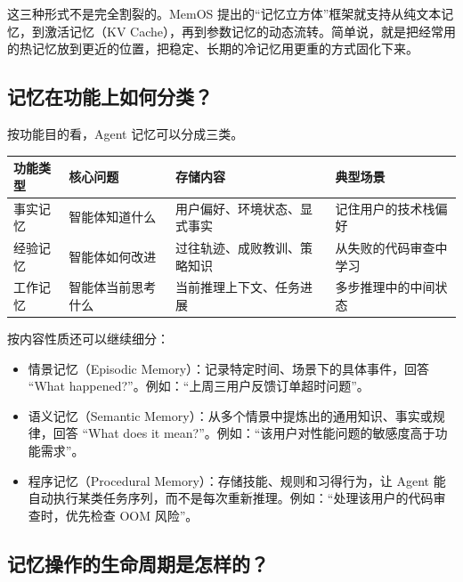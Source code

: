 \documentclass[9pt,a4paper,twocolumn]{ctexart}
\begin{document}
这三种形式不是完全割裂的。MemOS 提出的“记忆立方体”框架就支持从纯文本记忆，到激活记忆（KV Cache），再到参数记忆的动态流转。简单说，就是把经常用的热记忆放到更近的位置，把稳定、长期的冷记忆用更重的方式固化下来。



\subsection*{记忆在功能上如何分类？}


按功能目的看，Agent 记忆可以分成三类。


{\footnotesize
\begin{tabular}{|p{}|p{}|p{}|p{}|}
\hline
\textbf{功能类型} & \textbf{核心问题} & \textbf{存储内容} & \textbf{典型场景} \\
\hline
事实记忆 & 智能体知道什么 & 用户偏好、环境状态、显式事实 & 记住用户的技术栈偏好 \\
\hline
经验记忆 & 智能体如何改进 & 过往轨迹、成败教训、策略知识 & 从失败的代码审查中学习 \\
\hline
工作记忆 & 智能体当前思考什么 & 当前推理上下文、任务进展 & 多步推理中的中间状态 \\
\hline
\end{tabular}
}



按内容性质还可以继续细分：


\begin{itemize}[itemsep=1pt, topsep=2pt]
  \item 情景记忆（Episodic Memory）：记录特定时间、场景下的具体事件，回答 “What happened?”。例如：“上周三用户反馈订单超时问题”。
  \item 语义记忆（Semantic Memory）：从多个情景中提炼出的通用知识、事实或规律，回答 “What does it mean?”。例如：“该用户对性能问题的敏感度高于功能需求”。
  \item 程序记忆（Procedural Memory）：存储技能、规则和习得行为，让 Agent 能自动执行某类任务序列，而不是每次重新推理。例如：“处理该用户的代码审查时，优先检查 OOM 风险”。
\end{itemize}


\subsection*{记忆操作的生命周期是怎样的？}
\end{document}
